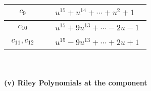 \documentclass[1p]{elsarticle_modified}
\theoremstyle{definition}
\begin{document}
\begin{tabular}{m{50pt}|m{274pt}}
\hline $$\begin{aligned}c_{9}\end{aligned}$$&$\begin{aligned}
&u^{15}+u^{14}+\cdots+u^2+1
\end{aligned}$\\
\hline $$\begin{aligned}c_{10}\end{aligned}$$&$\begin{aligned}
&u^{15}+9 u^{13}+\cdots-2 u-1
\end{aligned}$\\
\hline $$\begin{aligned}c_{11},c_{12}\end{aligned}$$&$\begin{aligned}
&u^{15}-9 u^{13}+\cdots+2 u+1
\end{aligned}$\\
\hline
\end{tabular}\\~\\
\newpage\renewcommand{\arraystretch}{1}
\flushleft \textbf{(v) Riley Polynomials at the component}\newline \\
\end{document}
